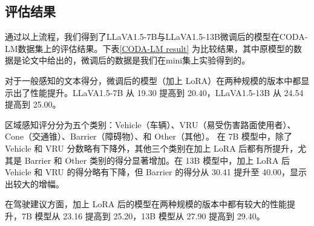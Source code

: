 \documentclass[
    linespread = 1.25
]{ctexart}
\begin{document}
\subsection{评估结果}
通过以上流程，我们得到了LLaVA1.5-7B与LLaVA1.5-13B微调后的模型在CODA-LM数据集上的评估结果。下表\ref{CODA-LM result}
为比较结果，其中原模型的数据是论文\cite{chen2024automatedevaluationlargevisionlanguage}中给出的，微调后的数据是我们在mini集上实验得到的。

对于一般感知的文本得分，微调后的模型（加上 LoRA）在两种规模的版本中都显示出了性能提升。LLaVA1.5-7B 从 19.30 提高到 20.40，LLaVA1.5-13B 从 24.54 提高到 25.00。

区域感知评分分为五个类别：Vehicle（车辆）、VRU（易受伤害路面使用者）、Cone（交通锥）、Barrier（障碍物）、和 Other（其他）。
在 7B 模型中，除了 Vehicle 和 VRU 分数略有下降外，其他三个类别在加上 LoRA 后都有所提升，尤其是 Barrier 和 Other 类别的得分显著增加。在 13B 模型中，加上 LoRA 后 Vehicle 和 VRU 的得分略有下降，但 Barrier 的得分从 30.41 提升至 40.00，显示出较大的增幅。

在驾驶建议方面，加上 LoRA 后的模型在两种规模的版本中都有较大的性能提升，7B 模型从 23.16 提高到 25.20，13B 模型从 27.90 提高到 29.40。
\end{document}
